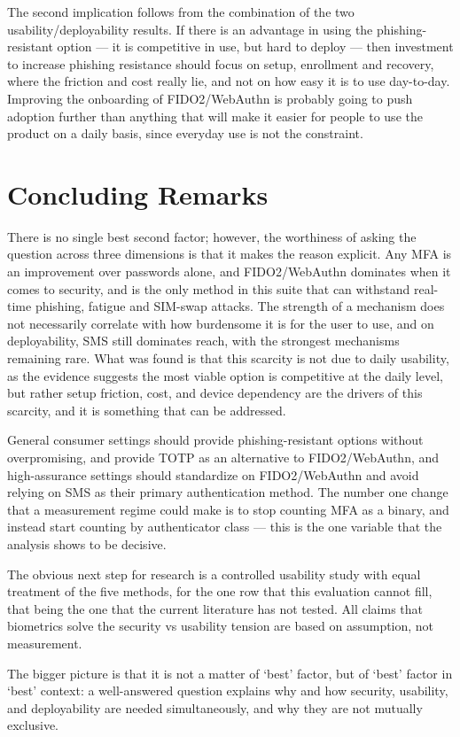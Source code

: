 \documentclass[sigconf]{acmart}
\begin{document}
The second implication follows from the combination of the two usability/deployability results. If there is an advantage in using the phishing-resistant option --- it is competitive in use, but hard to deploy --- then investment to increase phishing resistance should focus on setup, enrollment and recovery, where the friction and cost really lie, and not on how easy it is to use day-to-day. Improving the onboarding of FIDO2/WebAuthn is probably going to push adoption further than anything that will make it easier for people to use the product on a daily basis, since everyday use is not the constraint.

\section{Concluding Remarks}

There is no single best second factor; however, the worthiness of asking the question across three dimensions is that it makes the reason explicit. Any MFA is an improvement over passwords alone, and FIDO2/WebAuthn dominates when it comes to security, and is the only method in this suite that can withstand real-time phishing, fatigue and SIM-swap attacks. The strength of a mechanism does not necessarily correlate with how burdensome it is for the user to use, and on deployability, SMS still dominates reach, with the strongest mechanisms remaining rare. What was found is that this scarcity is not due to daily usability, as the evidence suggests the most viable option is competitive at the daily level, but rather setup friction, cost, and device dependency are the drivers of this scarcity, and it is something that can be addressed.

General consumer settings should provide phishing-resistant options without overpromising, and provide TOTP as an alternative to FIDO2/WebAuthn, and high-assurance settings should standardize on FIDO2/WebAuthn and avoid relying on SMS as their primary authentication method. The number one change that a measurement regime could make is to stop counting MFA as a binary, and instead start counting by authenticator class --- this is the one variable that the analysis shows to be decisive.

The obvious next step for research is a controlled usability study with equal treatment of the five methods, for the one row that this evaluation cannot fill, that being the one that the current literature has not tested. All claims that biometrics solve the security vs usability tension are based on assumption, not measurement.

The bigger picture is that it is not a matter of `best' factor, but of `best' factor in `best' context: a well-answered question explains why and how security, usability, and deployability are needed simultaneously, and why they are not mutually exclusive.



\end{document}
